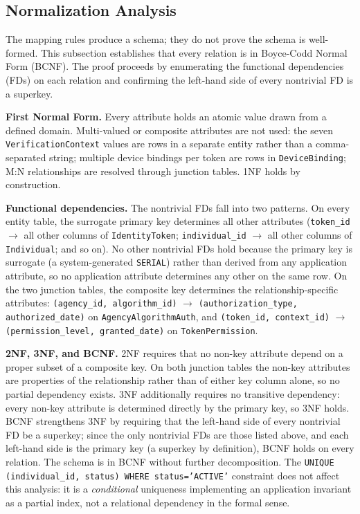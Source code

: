 \documentclass[11pt,letterpaper]{article}
\newcommand{\entity}[1]{\texttt{\color{navydark}#1}}
\begin{document}
\subsection{Normalization Analysis}
\label{subsec:normalization}

The mapping rules produce a schema; they do not prove the schema is well-formed. This subsection establishes that every relation is in Boyce-Codd Normal Form (BCNF). The proof proceeds by enumerating the functional dependencies (FDs) on each relation and confirming the left-hand side of every nontrivial FD is a superkey.

\textbf{First Normal Form.} Every attribute holds an atomic value drawn from a defined domain. Multi-valued or composite attributes are not used: the seven \texttt{VerificationContext} values are rows in a separate entity rather than a comma-separated string; multiple device bindings per token are rows in \entity{DeviceBinding}; M:N relationships are resolved through junction tables. 1NF holds by construction.

\textbf{Functional dependencies.} The nontrivial FDs fall into two patterns. On every entity table, the surrogate primary key determines all other attributes (\texttt{token\_id} $\to$ all other columns of \entity{IdentityToken}; \texttt{individual\_id} $\to$ all other columns of \entity{Individual}; and so on). No other nontrivial FDs hold because the primary key is surrogate (a system-generated \texttt{SERIAL}) rather than derived from any application attribute, so no application attribute determines any other on the same row. On the two junction tables, the composite key determines the relationship-specific attributes: \texttt{(agency\_id, algorithm\_id)} $\to$ \texttt{(authorization\_type, authorized\_date)} on \entity{AgencyAlgorithmAuth}, and \texttt{(token\_id, context\_id)} $\to$ \texttt{(permission\_level, granted\_date)} on \entity{TokenPermission}.

\textbf{2NF, 3NF, and BCNF.} 2NF requires that no non-key attribute depend on a proper subset of a composite key. On both junction tables the non-key attributes are properties of the relationship rather than of either key column alone, so no partial dependency exists. 3NF additionally requires no transitive dependency: every non-key attribute is determined directly by the primary key, so 3NF holds. BCNF strengthens 3NF by requiring that the left-hand side of every nontrivial FD be a superkey; since the only nontrivial FDs are those listed above, and each left-hand side is the primary key (a superkey by definition), BCNF holds on every relation. The schema is in BCNF without further decomposition. The \texttt{UNIQUE (individual\_id, status) WHERE status='ACTIVE'} constraint does not affect this analysis: it is a \textit{conditional} uniqueness implementing an application invariant as a partial index, not a relational dependency in the formal sense.
\end{document}
